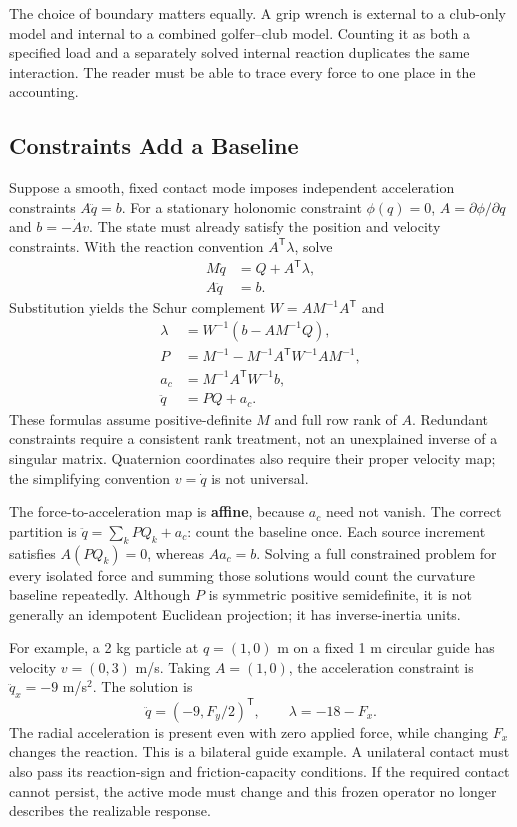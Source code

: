 The choice of boundary matters equally. A grip wrench is external to a club-only model and internal to a combined golfer--club model. Counting it as both a specified load and a separately solved internal reaction duplicates the same interaction. The reader must be able to trace every force to one place in the accounting.

\subsection{Constraints Add a Baseline}
Suppose a smooth, fixed contact mode imposes independent acceleration constraints \(A\ddot q=b\). For a stationary holonomic constraint \(\phi(q)=0\), \(A=\partial\phi/\partial q\) and \(b=-\dot A v\). The state must already satisfy the position and velocity constraints. With the reaction convention \(A^{\mathsf T}\lambda\), solve
\[
 \begin{aligned}
 M\ddot q&=Q+A^{\mathsf T}\lambda,\\
 A\ddot q&=b.
 \end{aligned}
\]
Substitution yields the Schur complement \(W=AM^{-1}A^{\mathsf T}\) and
\[
 \begin{aligned}
 \lambda&=W^{-1}(b-AM^{-1}Q),\\
 P&=M^{-1}-M^{-1}A^{\mathsf T}W^{-1}AM^{-1},\\
 a_c&=M^{-1}A^{\mathsf T}W^{-1}b,\\
 \ddot q&=PQ+a_c.
 \end{aligned}
\]
These formulas assume positive-definite \(M\) and full row rank of \(A\). Redundant constraints require a consistent rank treatment, not an unexplained inverse of a singular matrix. Quaternion coordinates also require their proper velocity map; the simplifying convention \(v=\dot q\) is not universal.

The force-to-acceleration map is \textbf{affine}, because \(a_c\) need not vanish. The correct partition is \(\ddot q=\sum_k PQ_k+a_c\): count the baseline once. Each source increment satisfies \(A(PQ_k)=0\), whereas \(Aa_c=b\). Solving a full constrained problem for every isolated force and summing those solutions would count the curvature baseline repeatedly. Although \(P\) is symmetric positive semidefinite, it is not generally an idempotent Euclidean projection; it has inverse-inertia units.

For example, a 2 kg particle at \(q=(1,0)\) m on a fixed 1 m circular guide has velocity \(v=(0,3)\) m/s. Taking \(A=(1,0)\), the acceleration constraint is \(\ddot q_x=-9\) m/s\(^2\). The solution is
\[
 \ddot q=(-9,F_y/2)^{\mathsf T},\qquad \lambda=-18-F_x.
\]
The radial acceleration is present even with zero applied force, while changing \(F_x\) changes the reaction. This is a bilateral guide example. A unilateral contact must also pass its reaction-sign and friction-capacity conditions. If the required contact cannot persist, the active mode must change and this frozen operator no longer describes the realizable response.

